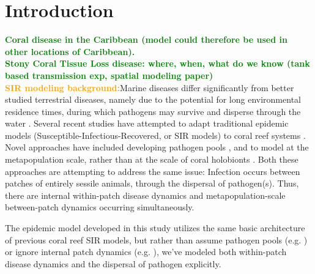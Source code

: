 \documentclass[utf8]{frontiersSCNS}
\newcommand{\erinn}[1]{\textbf{\textcolor{green}{#1}}}
\newcommand{\dan}[1]{\textbf{\textcolor{orange}{#1}}}
\begin{document}
\section{Introduction}
\erinn{Coral disease in the Caribbean (model could therefore be used in other locations of Caribbean). \\Stony Coral Tissue Loss disease: where, when, what do we know (tank based transmission exp, spatial modeling paper)} \\
\dan{SIR modeling background:}Marine diseases differ significantly from better studied terrestrial diseases, namely due to the potential for long environmental residence times, during which pathogens may survive and disperse through the water \citep{harvell2007coral, sokolow2009effects}. Several recent studies have attempted to adapt traditional epidemic models (Susceptible-Infectious-Recovered, or SIR models) to coral reef systems \citep{sokolow2009effects, bidegain2016microparasitic, bidegain2016marine}. Novel approaches have included developing pathogen pools \citep{bidegain2016microparasitic, bidegain2016marine}, and to model at the metapopulation scale, rather than at the scale of coral holobionts \citep{sokolow2009effects}. Both these approaches are attempting to address the same issue: Infection occurs between patches of entirely sessile animals, through the dispersal of pathogen(s). Thus, there are internal within-patch disease dynamics and metapopulation-scale between-patch dynamics occurring simultaneously.

The epidemic model developed in this study utilizes the same basic architecture of previous coral reef SIR models, but rather than assume pathogen pools (e.g. \cite{bidegain2016microparasitic, bidegain2016marine}) or ignore internal patch dynamics (e.g. \cite{sokolow2009effects}), we've modeled both within-patch disease dynamics and the dispersal of pathogen explicitly. \\
\end{document}

